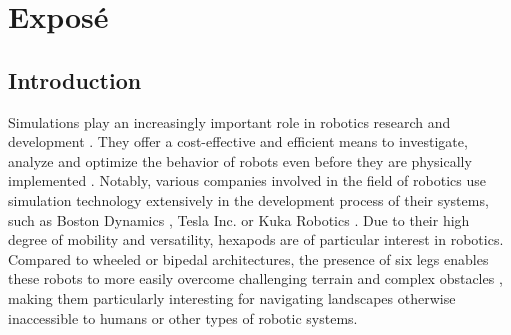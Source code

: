 \chapter{Exposé}
\label{ch:expose}



\section{Introduction}
Simulations play an increasingly important role in robotics research and development \parencite{afzal2020study}. 
They offer a cost-effective and efficient means to investigate, analyze and optimize the behavior of robots even before they are physically implemented \parencite{de2019analysis}. 
Notably, various companies involved in the field of robotics use simulation technology extensively in the development process of their systems, such as Boston Dynamics \parencite{BostonDynamicsSimulation}, Tesla Inc. \parencite{TeslaAiDay2022} or Kuka Robotics \parencite{KukaSim}.
Due to their high degree of mobility and versatility, hexapods are of particular interest in robotics. 
Compared to wheeled or bipedal architectures, the presence of six legs enables these robots to more easily overcome challenging terrain and complex obstacles \parencite{barai2013smart, atifystructure}, making them particularly interesting for navigating landscapes otherwise inaccessible to humans or other types of robotic systems.

